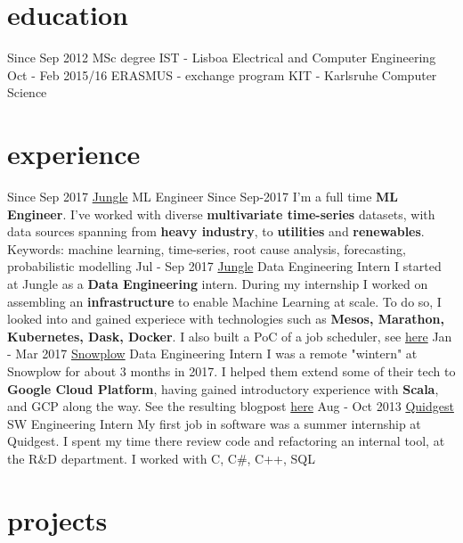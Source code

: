 \documentclass[]{colobas-cv}
\begin{document}
\section{education}
\entry
  {Since Sep 2012}
  {MSc degree}
  {IST - Lisboa}
  {Electrical and Computer Engineering}
\entry
  {Oct - Feb 2015/16}
  {ERASMUS - exchange program}
  {KIT - Karlsruhe}
  {Computer Science}

\section{experience}
\entry
  {Since Sep 2017}
  {\href{https://jungle.ai}{Jungle}}
  {ML Engineer}
  {Since Sep-2017 I'm a full time \textbf{ML Engineer}. I've worked with diverse 
  \textbf{multivariate time-series} datasets, with data sources spanning from 
  \textbf{heavy industry}, to \textbf{utilities} and \textbf{renewables}.
  Keywords: machine learning, time-series, root cause analysis, forecasting,
  probabilistic modelling}
\entry
  {Jul - Sep 2017}
  {\href{https://jungle.ai}{Jungle}}
  {Data Engineering Intern}
  {I started at Jungle as a \textbf{Data Engineering} intern. During my internship I
  worked on assembling an \textbf{infrastructure} to enable Machine Learning at scale.
  To do so, I looked into and gained experiece with technologies such as
  \textbf{Mesos, Marathon, Kubernetes, Dask, Docker}. I also built a PoC of a
  job scheduler, see \href{https://github.com/colobas/obras}{here}}
\entry
  {Jan - Mar 2017}
  {\href{https://snowplowanalytics.com}{Snowplow}}
  {Data Engineering Intern}
  {I was a remote "wintern" at Snowplow for about 3 months in 2017. I helped
  them extend some of their tech to \textbf{Google Cloud Platform}, having gained 
  introductory experience with \textbf{Scala}, and GCP along the way. See the
  resulting blogpost \href{https://snowplowanalytics.com/blog/2017/03/30/google-cloud-dataflow-example-project-released/}{here}}
\entry
  {Aug - Oct 2013}
  {\href{https://quidgest.com}{Quidgest}}
  {SW Engineering Intern}
  {My first job in software was a summer internship at Quidgest. I spent my time
  there review code and refactoring an internal tool, at the R\&D department.
  I worked with C, C\#, C++, SQL}
\section{projects}
\end{document}
